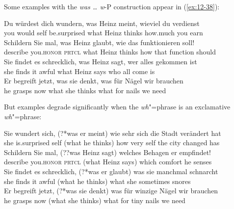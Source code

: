 \documentclass[output=paper]{langsci/langscibook}
\begin{document}
Some examples with the \textit{was \ldots{}  w}-P construction appear in (\ref{ex:12-38}):
\begin{exe}
\ex
\label{ex:12-38}
\begin{xlist}
\ex
\label{ex:12-38a}
\gll
Du würdest dich wundern, was Heinz meint, wieviel du
verdienst\\
you would self be.surprised what Heinz thinks how.much you earn \\\jambox{= (\ref{ex:12-21a})}
\ex
\label{ex:12-38b}
\gll
Schildern Sie mal, was Heinz glaubt, wie das funktionieren
soll! \\
describe you.\textsc{honor} \textsc{prtcl} what Heinz thinks how that
function should \\\jambox{= (\ref{ex:12-21b})}
\ex
\label{ex:12-38c}
\gll
Sie findet es schrecklich, was Heinz sagt, wer alles gekommen ist \\
she finds it awful what Heinz says who all come is\\
\ex
\label{ex:12-38d}
\gll
Er begreift jetzt, was sie denkt, was für Nägel wir brauchen \\
he grasps now what she thinks what for nails we need \\
\end{xlist}
\end{exe}
But examples degrade significantly when the \emph{wh}"=phrase is an
exclamative \emph{wh}"=phrase:
\begin{exe}
\ex
\label{ex:12-39}
\begin{xlist}
\ex
\label{ex:12-39a}
\gll
Sie wundert sich, (?*was er meint) wie sehr sich die Stadt verändert hat \\
she is.surprised self (\phantom{?*}what he thinks) how very self the city changed has \\
\ex
\label{ex:12-39b}
\gll
Schildern Sie mal, (??was Heinz sagt) welches Behagen er empfindet! \\
describe you.\textsc{honor} \textsc{prtcl} (\phantom{??}what Heinz says) which comfort he senses \\
\ex
\label{ex:12-39c}
\gll
Sie findet es schrecklich, (?*was er glaubt) was sie manchmal schnarcht \\
she finds it awful (\phantom{?*}what he thinks) what she sometimes snores \\
\ex
\label{ex:12-39d}
\gll
Er begreift jetzt, (?*was sie denkt) was für winzige Nägel wir brauchen \\
he grasps now (\phantom{?*}what she thinks) what for tiny nails we need \\
\end{xlist}
\end{exe}
\end{document}
